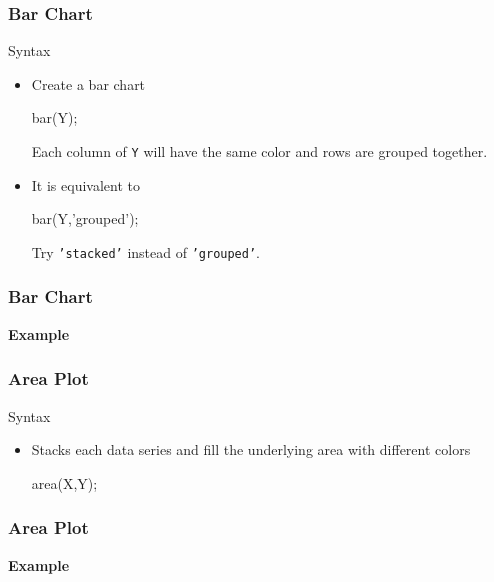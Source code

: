 \documentclass[compress]{beamer}  %
\begin{document}
\begin{frame}[fragile]
\frametitle{Bar Chart}

\begin{block}{Syntax}
\begin{itemize}[<+->]
    \item Create a bar chart
          \begin{matlabcodebeamer}[numbers=none,frame=none]
          bar(Y);
          \end{matlabcodebeamer}
          Each column of \texttt{Y} will have the same color and rows are grouped together.
    \item It is equivalent to
          \begin{matlabcodebeamer}[numbers=none,frame=none]
          bar(Y,'grouped');
          \end{matlabcodebeamer}
          Try \texttt{'stacked'} instead of \texttt{'grouped'}.
\end{itemize}
\end{block}

\end{frame}
\begin{frame}[fragile]
\frametitle{Bar Chart}
\textbf{Example} 

\setcounter{subfigure}{0}
\begin{figure}
    \centering
\end{figure}

\end{frame}
\begin{frame}[fragile]
\frametitle{Area Plot}

\begin{block}{Syntax}
\begin{itemize}
    \item Stacks each data series and fill the underlying area with different colors
          \begin{matlabcodebeamer}[numbers=none,frame=none]
          area(X,Y);
          \end{matlabcodebeamer}
\end{itemize}
\end{block}

\end{frame}
\begin{frame}[fragile]
\frametitle{Area Plot}
\textbf{Example} 

\setcounter{subfigure}{0}
\begin{figure}
    \centering
\end{figure}

\end{frame}
\end{document}
